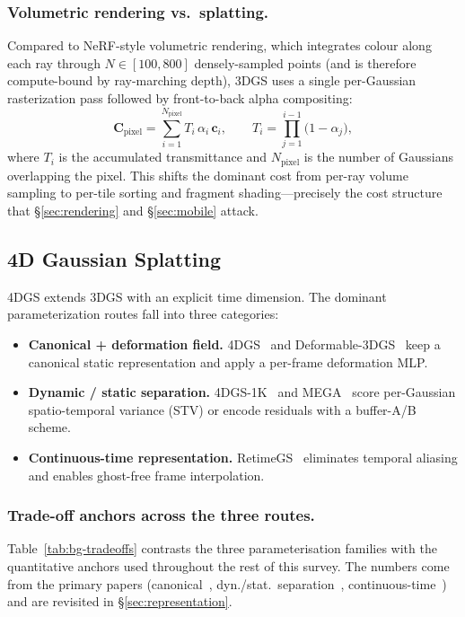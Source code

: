 \subsubsection{Volumetric rendering vs.\ splatting.}
Compared to NeRF-style volumetric rendering, which integrates
colour along each ray through $N\!\in\![100,800]$ densely-sampled
points (and is therefore compute-bound by ray-marching depth),
3DGS uses a single per-Gaussian rasterization pass followed by
front-to-back alpha compositing:
\begin{equation}
  \mathbf{C}_{\text{pixel}} = \sum_{i=1}^{N_{\text{pixel}}}
      T_i\,\alpha_i\,\mathbf{c}_i, \qquad
  T_i = \prod_{j=1}^{i-1}\bigl(1-\alpha_j\bigr),
  \label{eq:alpha}
\end{equation}
where $T_i$ is the accumulated transmittance and $N_{\text{pixel}}$
is the number of Gaussians overlapping the pixel. This shifts the
dominant cost from per-ray volume sampling to per-tile sorting and
fragment shading---precisely the cost structure that
\S\ref{sec:rendering} and \S\ref{sec:mobile} attack.

\subsection{4D Gaussian Splatting}
4DGS extends 3DGS with an explicit time dimension. The dominant
parameterization routes fall into three categories:
\begin{itemize}
  \item \textbf{Canonical + deformation field.}
        4DGS~\cite{wu20244dgs} and Deformable-3DGS~\cite{yang2023deformable3dgs}
        keep a canonical static representation and apply a per-frame
        deformation MLP.
  \item \textbf{Dynamic / static separation.}
        4DGS-1K~\cite{yuan20254dgs1k} and MEGA~\cite{zhang2024mega4dgsacceleration}
        score per-Gaussian spatio-temporal variance (STV) or encode
        residuals with a buffer-A/B scheme.
  \item \textbf{Continuous-time representation.}
        RetimeGS~\cite{wang2026retimegs} eliminates temporal aliasing
        and enables ghost-free frame interpolation.
\end{itemize}

\subsubsection{Trade-off anchors across the three routes.}
Table~\ref{tab:bg-tradeoffs} contrasts the three parameterisation
families with the quantitative anchors used throughout the rest of
this survey. The numbers come from the primary papers
(canonical~\cite{wu20244dgs,yang2023deformable3dgs}, dyn./stat.\
separation~\cite{yuan20254dgs1k,zhang2024mega4dgsacceleration},
continuous-time~\cite{wang2026retimegs}) and are revisited in
\S\ref{sec:representation}.

